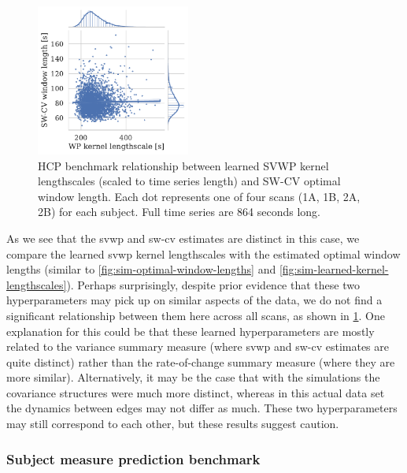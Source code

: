 \begin{figure}[t]
  \centering
  \includegraphics[width=0.45\textwidth]{fig/hcp/d15/lengthscale_optimal_window_length_relations}
  \caption{
    HCP benchmark relationship between learned SVWP kernel lengthscales (scaled to time series length) and SW-CV optimal window length.
    Each dot represents one of four scans (1A, 1B, 2A, 2B) for each subject.
    Full time series are 864 seconds long.
  }\label{fig:sim-relationship-lengthscale-optimal-window-length}
\end{figure}


As we see that the \gls{svwp} and \gls{sw-cv} estimates are distinct in this case, we compare the learned \gls{svwp} kernel lengthscales with the estimated optimal window lengths (similar to \cref{fig:sim-optimal-window-lengths} and \cref{fig:sim-learned-kernel-lengthscales}).
Perhaps surprisingly, despite prior evidence that these two hyperparameters may pick up on similar aspects of the data, we do not find a significant relationship between them here across all scans, as shown in \cref{fig:sim-relationship-lengthscale-optimal-window-length}.
One explanation for this could be that these learned hyperparameters are mostly related to the variance summary measure (where \gls{svwp} and \gls{sw-cv} estimates are quite distinct) rather than the rate-of-change summary measure (where they are more similar).
Alternatively, it may be the case that with the simulations the covariance structures were much more distinct, whereas in this actual data set the dynamics between edges may not differ as much.
These two hyperparameters may still correspond to each other, but these results suggest caution.

\subsubsection{Subject measure prediction benchmark}


